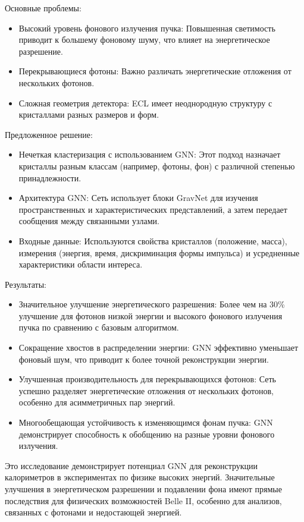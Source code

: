 \documentclass[a4paper,12pt]{extarticle}
\begin{document}
Основные проблемы:

\begin{itemize}
    \item Высокий уровень фонового излучения пучка: Повышенная светимость приводит к большему фоновому шуму, что влияет на энергетическое разрешение.
    \item Перекрывающиеся фотоны: Важно различать энергетические отложения от нескольких фотонов.
    \item Сложная геометрия детектора: ECL имеет неоднородную структуру с кристаллами разных размеров и форм.
\end{itemize}

Предложенное решение:

\begin{itemize}
    \item Нечеткая кластеризация с использованием GNN: Этот подход назначает кристаллы разным классам (например, фотоны, фон) с различной степенью принадлежности.
    \item Архитектура GNN: Сеть использует блоки GravNet для изучения пространственных и характеристических представлений, а затем передает сообщения между связанными узлами.
    \item Входные данные: Используются свойства кристаллов (положение, масса), измерения (энергия, время, дискриминация формы импульса) и усредненные характеристики области интереса.
\end{itemize}

Результаты:

\begin{itemize}
    \item Значительное улучшение энергетического разрешения: Более чем на 30\% улучшение для фотонов низкой энергии и высокого фонового излучения пучка по сравнению с базовым алгоритмом.
    \item Сокращение хвостов в распределении энергии: GNN эффективно уменьшает фоновый шум, что приводит к более точной реконструкции энергии.
    \item Улучшенная производительность для перекрывающихся фотонов: Сеть успешно разделяет энергетические отложения от нескольких фотонов, особенно для асимметричных пар энергий.
    \item Многообещающая устойчивость к изменяющимся фонам пучка: GNN демонстрирует способность к обобщению на разные уровни фонового излучения.
\end{itemize}

Это исследование демонстрирует потенциал GNN для реконструкции калориметров в экспериментах по физике высоких энергий. Значительные улучшения в энергетическом разрешении и подавлении фона имеют прямые последствия для физических возможностей Belle II, особенно для анализов, связанных с фотонами и недостающей энергией.
\end{document}
